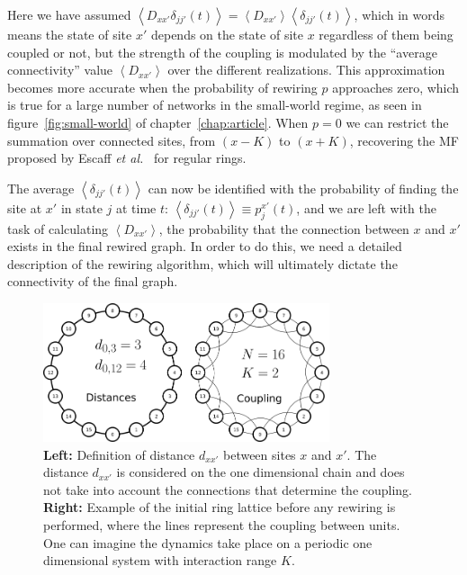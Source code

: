 \noindent Here we have assumed $\left< D_{xx'}\delta_{jj'}(t)\right> = \left< D_{xx'}\right>\left<\delta_{jj'}(t)\right>$, which in
words means the state of site $x'$ depends on the state of site $x$ regardless of them being coupled or not, but the strength of the
coupling is modulated by the ``average connectivity'' value $\left< D_{xx'} \right>$ over the different realizations. This
approximation becomes more accurate when the probability of rewiring $p$ approaches zero, which is true for a large number of networks
in the small-world regime, as seen in figure~\ref{fig:small-world} of chapter~\ref{chap:article}. When $p=0$ we can restrict the
summation over connected sites, from $(x-K)$ to $(x+K)$, recovering the MF proposed by Escaff \textit{et al.}~\cite{escaff2014arrays}
for regular rings.

The average $\left< \delta_{jj'}(t) \right>$ can now be identified with the probability of finding the site at $x'$ in state $j$ at
time $t$: $\left< \delta_{jj'}(t) \right> \equiv p^{x'}_j(t)$, and we are left with the task of calculating $\left< D_{xx'} \right>$,
the probability that the connection between $x$ and $x'$ exists in the final rewired graph.  In order to do this, we need a detailed
description of the rewiring algorithm, which will ultimately dictate the connectivity of the final graph. 

\begin{figure}
    \centering
    \includegraphics[width=0.75\textwidth]{fig/ring-distance.png}
    \caption{\label{fig:ring-distance}
        \textbf{Left:} Definition of distance $d_{xx'}$ between sites $x$ and $x'$. The distance $d_{xx'}$ is considered on the one
        dimensional chain and does not take into account the connections that determine the coupling.\\
        \textbf{Right:} Example of the initial ring lattice before any rewiring is performed, where the lines represent the coupling
        between units.\\
        One can imagine the dynamics take place on a periodic one dimensional system with interaction range $K$.
    }
\end{figure}

